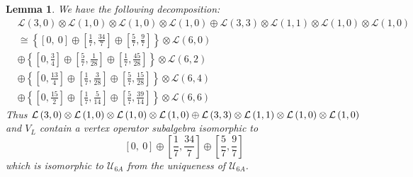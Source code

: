\documentclass{article}
\newtheorem{lemma}{Lemma}[section]
\begin{document}
	\begin{lemma} \label{realization of VOA}We have the following decomposition:
		\begin{align*}
			& \mathcal{L}\left(3,0\right)\otimes\mathcal{L}\left(1,0\right)\otimes\mathcal{L}\left(1,0\right)\otimes\mathcal{L}\left(1,0\right)\oplus\mathcal{L}\left(3,3\right)\otimes\mathcal{L}\left(1,1\right)\otimes\mathcal{L}\left(1,0\right)\otimes\mathcal{L}\left(1,0\right)\\
			& \cong\left\{ \left[0,\ 0\right]\oplus\left[\frac{1}{7},\frac{34}{7}\right]\oplus\left[\frac{5}{7},\frac{9}{7}\right]\right\} \otimes\mathcal{L}\left(6,0\right)\\
			& \oplus\left\{ \left[0,\frac{3}{4}\right]\oplus\left[\frac{5}{7},\frac{1}{28}\right]\oplus\left[\frac{1}{7},\frac{45}{28}\right]\right\} \otimes\mathcal{L}\left(6,2\right)\\
			& \oplus\left\{ \left[0,\frac{13}{4}\right]\oplus\left[\frac{1}{7},\frac{3}{28}\right]\oplus\left[\frac{5}{7},\frac{15}{28}\right]\right\} \otimes\mathcal{L}\left(6,4\right)\\
			& \oplus\left\{ \left[0,\frac{15}{2}\right]\oplus\left[\frac{1}{7},\frac{5}{14}\right]\oplus\left[\frac{5}{7},\frac{39}{14}\right]\right\} \otimes\mathcal{L}\left(6,6\right)
		\end{align*}
		Thus $\text{\ensuremath{\mathcal{L}}}\left(3,0\right)\otimes\mathcal{L}\left(1,0\right)\otimes\mathcal{L}\left(1,0\right)\otimes\mathcal{L}\left(1,0\right)\oplus\mathcal{L}\left(3,3\right)\otimes\mathcal{L}\left(1,1\right)\otimes\mathcal{L}\left(1,0\right)\otimes\mathcal{L}\left(1,0\right)$
		and $V_{L}$ contain a vertex operator subalgebra isomorphic to
		\[
		\left[0,\ 0\right]\oplus\left[\frac{1}{7},\frac{34}{7}\right]\oplus\left[\frac{5}{7},\frac{9}{7}\right]
		\]
		which is isomorphic to $\mathcal{U}_{6A}$ from the uniqueness of $\mathcal{U}_{6A}$.
	\end{lemma} 
	
\end{document}
